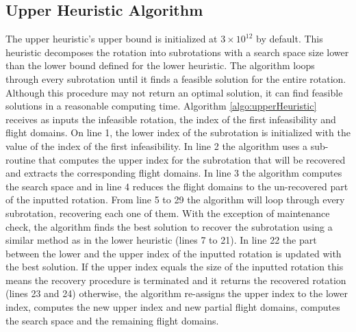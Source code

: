 \subsection{Upper Heuristic Algorithm} \label{sec:upperHeuristic}

The upper heuristic's upper bound is initialized at $3 \times 10^{12}$ by default. This heuristic  decomposes the rotation into subrotations with a search space size lower than the lower bound defined for the lower heuristic. The algorithm loops through every subrotation until it finds a feasible solution for the entire rotation. Although this procedure may not return an optimal solution, it can find feasible solutions in a reasonable computing time. Algorithm \ref{algo:upperHeuristic} receives as inputs the infeasible rotation, the index of the first infeasibility and flight domains. On line 1, the lower index of the subrotation is initialized with the value of the index of the first infeasibility. In line 2 the algorithm uses a sub-routine that computes the upper index for the subrotation that will be recovered and extracts the corresponding flight domains. In line 3 the algorithm computes the search space and  in line 4 reduces the flight domains to the un-recovered part of the inputted rotation. From line 5 to 29 the algorithm will loop through every subrotation, recovering each one of them. With the exception of maintenance check, the algorithm finds the best solution to recover the subrotation using a similar method as in the lower heuristic (lines 7 to 21). In line 22 the part between the lower and the upper index of the inputted rotation is updated with the best solution. If the upper index equals the size of the inputted rotation this means the recovery procedure is terminated and it returns the recovered rotation (lines 23 and 24) otherwise, the algorithm re-assigns the upper index to the lower index, computes the new upper index and new partial flight domains, computes the search space and the remaining flight domains.


